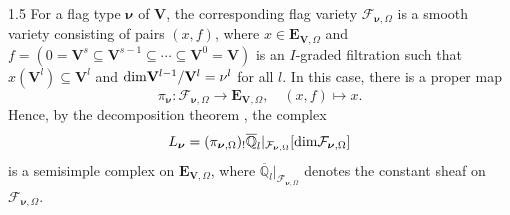 \documentclass[10pt]{amsart}
\def\dim{\mbox{\rm dim}}   \def\End{\mbox{\rm End}}
\begin{document}
\begin{spacing}{1.5}
For a flag type $\boldsymbol{\nu}$ of $\mathbf{V}$, the corresponding flag variety $\mathcal{F}_{\boldsymbol{\nu},\Omega}$ is a smooth variety consisting of pairs $(x, f)$, where $x \in \mathbf{E}_{\mathbf{V},\Omega}$ and $f = ( 0= \mathbf{V}^{s} \subseteq \mathbf{V}^{s-1} \subseteq \cdots \subseteq \mathbf{V}^{0} = \mathbf{V})$ is an $I$-graded filtration such that $x(\mathbf{V}^{l}) \subseteq \mathbf{V}^{l}$ and
$
\dim \mathbf{V}^{l-1} / \mathbf{V}^{l} = \nu^{l}
$
for all $l$. In this case, there is a proper map
\[
\pi_{\boldsymbol{\nu}} : \mathcal{F}_{\boldsymbol{\nu},\Omega} \to \mathbf{E}_{\mathbf{V},\Omega}, \quad (x, f) \mapsto x.
\]
Hence, by the decomposition theorem \cite[Theorem 5.4.5]{BBD}, the complex
\[
L_{\boldsymbol{\nu}} = (\pi_{\boldsymbol{\nu},\Omega})_{!} \overline{\mathbb{Q}}_{l}|_{\mathcal{F}_{\boldsymbol{\nu},\Omega}} [\dim \mathcal{F}_{\boldsymbol{\nu},\Omega}]
\]
is a semisimple complex on $\mathbf{E}_{\mathbf{V},\Omega}$, where $\overline{\mathbb{Q}}_{l}|_{\mathcal{F}_{\boldsymbol{\nu},\Omega}}$ denotes the constant sheaf on $\mathcal{F}_{\boldsymbol{\nu},\Omega}$.


\end{spacing}
\end{document}
